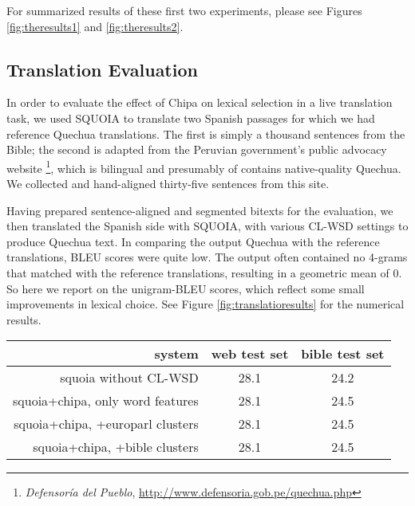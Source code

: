 \documentclass[10pt, a4paper]{article}
\begin{document}
For summarized results of these first two experiments, please see Figures
\ref{fig:theresults1} and \ref{fig:theresults2}.

\subsection{Translation Evaluation}
In order to evaluate the effect of Chipa on lexical selection in a live
translation task, we used SQUOIA to translate two Spanish passages for which we
had reference Quechua translations. The first is simply a thousand sentences
from the Bible; the second is adapted from the Peruvian government's public
advocacy website \footnote{\emph{Defensoría del Pueblo},
\url{http://www.defensoria.gob.pe/quechua.php}}, which is bilingual and
presumably of contains native-quality Quechua. We collected and hand-aligned
thirty-five sentences from this site.

Having prepared sentence-aligned and segmented bitexts for the evaluation,
we then translated the Spanish side with SQUOIA, with various CL-WSD settings
to produce Quechua text. In comparing the output Quechua with the reference
translations, BLEU scores were quite low. The output often contained no 4-grams
that matched with the reference translations, resulting in a geometric mean of
0. So here we report on the unigram-BLEU scores, which reflect some small
improvements in lexical choice.
See Figure \ref{fig:translatioresults} for the numerical results.

\begin{figure*}[t!]
  \begin{center}
  \begin{tabular}{|r|c|c|}
    \hline
    system                           & web test set & bible test set  \\
    \hline
    squoia without CL-WSD            & 28.1         & 24.2            \\
    squoia+chipa, only word features & 28.1         & 24.5            \\
    squoia+chipa, +europarl clusters & 28.1         & 24.5            \\
    squoia+chipa, +bible    clusters & 28.1         & 24.5            \\
    \hline
  \end{tabular}
  \end{center}
  \caption{BLEU-1 scores (modified unigram precision) for the various CL-WSD
  settings of SQUOIA on the two different Spanish-Quechua test sets.}
\label{fig:translatioresults}
\end{figure*}
\end{document}
